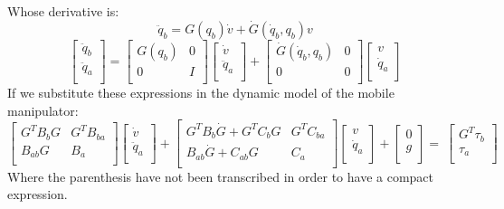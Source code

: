 Whose derivative is:
\begin{equation}
\ddot{q}_b=G\left(q_b\right)\dot{v}+\dot{G}\left(\dot{q}_b,q_b\right)v
\end{equation}
\begin{equation}
\left[\begin{matrix}\ddot{q}_b\\\ddot{q}_a\\\end{matrix}\right]=\left[\begin{matrix}G(q_b)&0\\0&I\\\end{matrix}\right]\left[\begin{matrix}\dot{v}\\\ddot{q}_a\\\end{matrix}\right]+\left[\begin{matrix}\dot{G}\left(\dot{q}_b,q_b\right)&0\\0&0\\\end{matrix}\right]\left[\begin{matrix}v\\\dot{q}_a\\\end{matrix}\right]
\end{equation}
If we substitute these expressions in the dynamic model of the mobile manipulator:
\begin{equation} \label{dynamicsMM}
\left[\begin{matrix}G^TB_bG&G^TB_{ba}\\B_{ab}G&B_a\\\end{matrix}\right]\left[\begin{matrix}\dot{v}\\\ddot{q}_a\\\end{matrix}\right]+\left[\begin{matrix}G^TB_b\dot{G}+G^TC_bG&G^TC_{ba}\\B_{ab}\dot{G}+C_{ab}G&C_a\\\end{matrix}\right]\left[\begin{matrix}v\\\dot{q}_a\\\end{matrix}\right]+\left[\begin{matrix}0\\g\\\end{matrix}\right]=\ \left[\begin{matrix}G^T\tau_b\\\tau_a\\\end{matrix}\right]
\end{equation}
Where the parenthesis have not been transcribed in order to have a compact expression.

